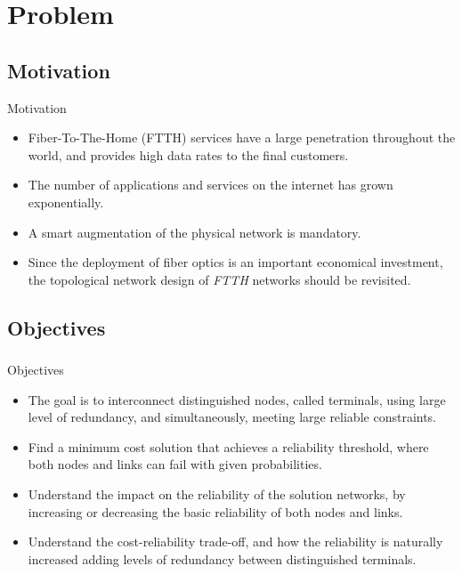 \section{Problem}
\subsection{Motivation}
\begin{frame}%
    \begin{block}{Motivation}
    \begin{itemize} 
    	\item Fiber-To-The-Home (FTTH) services have a large penetration throughout the world, and provides high data rates to the final customers.
    	\item The number of applications and services on the internet has grown exponentially.
    	\item A smart augmentation of the physical network is mandatory.
    	\item Since the deployment of fiber optics is an important economical investment, the topological network design of \emph{FTTH} networks should be revisited.
	\end{itemize} 
    \end{block}
\end{frame}

\subsection{Objectives}
\begin{frame}
	\frametitle{}
    \begin{block}{Objectives}
	\begin{itemize} 
    	\item The goal is to interconnect distinguished nodes, called terminals, using large level of redundancy, and simultaneously, meeting large reliable constraints. 
		\item Find a minimum cost solution that achieves a reliability threshold, where both nodes and
links can fail with given probabilities.
	\item Understand the impact on the reliability of the solution networks, by increasing or decreasing the basic reliability of both nodes and links.
	\item Understand the cost-reliability trade-off, and how the reliability is naturally increased adding levels of redundancy between distinguished terminals.
	\end{itemize} 
    \end{block}
\end{frame}

